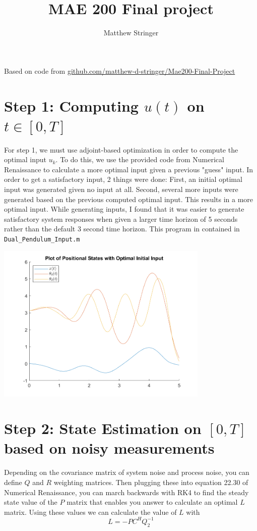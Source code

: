 \documentclass{article}
\title{MAE 200 Final project}
\author{Matthew Stringer}
\date{}
\theoremstyle{definition}
\begin{document}
    \maketitle
    \noindent Based on code from 
    \href{https://github.com/matthew-d-stringer/Mae200-Final-Project}{github.com/matthew-d-stringer/Mae200-Final-Project}

    \section*{Step 1: Computing $u(t)$ on $t \in [0,T]$}
    For step 1, we must use adjoint-based optimization in order to compute
    the optimal input $u_k$. To do this, we use the provided code from 
    Numerical Renaissance to calculate a more optimal input given a previous
    "guess" input. In order to get a satisfactory input, 2 things were done:
    First, an initial optimal input was generated given no input at all.
    Second, several more inputs were generated based on the previous computed
    optimal input.
    This results in a more optimal input.
    While generating inputs, I found that it was easier to generate satisfactory
    system responses when given a larger time horizon of 5 seconds rather than
    the default 3 second time horizon.
    This program in contained in \texttt{Dual\_Pendulum\_Input.m}
    \begin{center}
        \includegraphics*[width=4in]{Matlab Code/Step1_final_plot.png}
    \end{center}

    \section*{Step 2: State Estimation on $[0,T]$ based on noisy measurements}
    Depending on the covariance matrix of system noise and process noise, you can
    define $Q$ and $R$ weighting matrices. Then plugging these into equation 22.30
    of Numerical Renaissance, you can march backwards with RK4 to find the 
    steady state value of the $P$ matrix that enables you answer to calculate an 
    optimal $L$ matrix. 
    Using these values we can calculate the value of $L$ with
    \begin{equation*}
        L = -PC^H Q_2^{-1}
    \end{equation*} 
    
\end{document}
